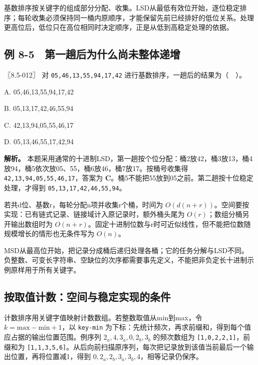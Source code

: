 基数排序按关键字的组成部分分配、收集。LSD从最低有效位开始，逐位稳定排序；每轮收集必须保持同一桶内原顺序，才能保留先前已经排好的低位关系。处理更高位后，低位只在高位相同时决定顺序，正是从低到高稳定处理的依据。


\subsection{例 8-5　第一趟后为什么尚未整体递增}\label{ds-ex8-5}

\noindent{}〖8.5-012〗 对 \allowbreak{}\texttt{05,}\allowbreak{}\texttt{46,}\allowbreak{}\texttt{13,}\allowbreak{}\texttt{55,}\allowbreak{}\texttt{94,}\allowbreak{}\texttt{17,}\allowbreak{}\texttt{42} 进行基数排序，一趟后的结果为（　）。

A. 05,46,13,55,94,17,42

B. 05,13,17,42,46,55,94

C. 42,13,94,05,55,46,17

D. 05,13,46,55,17,42,94


\textbf{解析。} 本题采用通常的十进制LSD，第一趟按个位分配：桶2放42，桶3放13，桶4放94，桶5依次放05、55，桶6放46，桶7放17。按桶号收集得 \allowbreak{}\texttt{42,}\allowbreak{}\texttt{13,}\allowbreak{}\texttt{94,}\allowbreak{}\texttt{05,}\allowbreak{}\texttt{55,}\allowbreak{}\texttt{46,}\allowbreak{}\texttt{17}，答案为 \textbf{C}。桶5不能把55放到05之前。第二趟按十位稳定处理，才得到 \allowbreak{}\texttt{05,}\allowbreak{}\texttt{13,}\allowbreak{}\texttt{17,}\allowbreak{}\texttt{42,}\allowbreak{}\texttt{46,}\allowbreak{}\texttt{55,}\allowbreak{}\texttt{94}。

若共d位、基数r，每轮分配n项并收集r个桶，时间为 \(O(d(n+r))\)。空间要按实现：已有链式记录、链接域计入原记录时，额外桶头尾为 \(O(r)\)；数组分桶另开输出数组时为 \(O(n+r)\)。固定十进制位数与r时可近似线性，但不能把位数随规模增长的情形也无条件写为 \(O(n)\)。

MSD从最高位开始，把记录分成桶后递归处理各桶；它的任务分解与LSD不同。负整数、可变长字符串、空缺位的次序都需要事先定义，不能把非负定长十进制示例原样用于所有关键字。

\subsection{按取值计数：空间与稳定实现的条件}\label{ds-c08-h175}

计数排序用关键字值映射计数数组。若整数取值从min到max，令 \(k=\mathrm{max}-\mathrm{min}+1\)，以 \allowbreak{}\texttt{key-min} 为下标：先统计频次，再求前缀和，得到每个值应占据的输出位置范围。例序列 \(2_a,4,3_a,0,2_b,3_b\) 的频次数组为 \allowbreak{}\texttt{{[}1,}\allowbreak{}\texttt{0,}\allowbreak{}\texttt{2,}\allowbreak{}\texttt{2,}\allowbreak{}\texttt{1{]}}，前缀和为 \allowbreak{}\texttt{{[}1,}\allowbreak{}\texttt{1,}\allowbreak{}\texttt{3,}\allowbreak{}\texttt{5,}\allowbreak{}\texttt{6{]}}。从后向前扫描原序列，每次把记录放到该值当前最后一个输出位置，再将位置减1，得到 \(0,2_a,2_b,3_a,3_b,4\)，相等记录仍保序。

